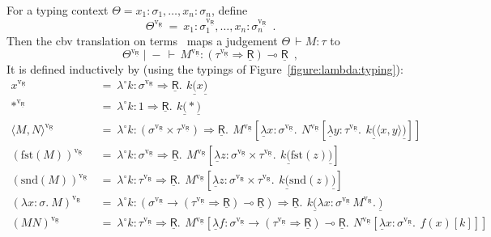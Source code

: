 \documentclass{LMCS}
\newcommand{\comptype}[1]{\underline{#1}}
\newcommand{\CR}{\comptype{\mathsf{R}}}
\newcommand{\Vone}{1}
\newcommand{\Vfun}{\to}
\newcommand{\lpop}{\multimap}
\newcommand{\Cfun}{\Rightarrow}
\newcommand{\In}[2]{#1 \colon  \! #2}
\newcommand{\rIn}[2]{#1 \colon  #2}
\newcommand{\Cj}[4]{#1 \mid  \! #2 \, \vdash \, \rIn{#3}{#4}}
\newcommand{\Vj}[3]{\Cj{#1}{{-}}{#2}{#3}}
\newcommand{\Vstar}{{*}}
\newcommand{\Vpair}[2]{\langle #1 , #2 \rangle}
\newcommand{\Vfst}[1]{\mathrm{fst}(#1)}
\newcommand{\Vsnd}[1]{\mathrm{snd}(#1)}
\newcommand{\Vlam}[3]{\lambda \In{#1}{#2}.\: #3}
\newcommand{\Vappl}[2]{#1(#2)}
\newcommand{\compop}[1]{\underline{#1}}
\newcommand{\Clam}[3]{\compop{\lambda} \In{#1}{#2}.\: #3}
\newcommand{\Cappl}[2]{#1\compop{(}#2\compop{)}}
\newcommand{\llambda}{\lambda^{\!\circ\!}}
\newcommand{\llam}[3]{\llambda \In{#1}{#2}.\: #3}
\newcommand{\lappl}[2]{#1[#2]}
\newcommand{\Lprod}{\times}
\newcommand{\Lj}[3]{#1  \, \vdash  \rIn{#2}{#3}}
\newcommand{\Lstar}{*}
\newcommand{\Lpair}[2]{\langle #1 , #2 \rangle}
\newcommand{\Lfst}[1]{\mathrm{fst}(#1)}
\newcommand{\Lsnd}[1]{\mathrm{snd}(#1)}
\newcommand{\Llam}[3]{\lambda \In{#1}{#2}.\: #3}
\newcommand{\Lappl}[2]{#1  #2}
\newcommand{\cbvLincps}[1]{#1^{\mathrm{v_{\CR}}}}
\begin{document}
For a typing context $\Theta = \In{x_1}{\sigma_1}, \ldots, \In{x_n}{\sigma_n}$, define
\[
\cbvLincps{\Theta} \: = \: \In{x_1}{\cbvLincps{\sigma_1}}, \ldots, \In{x_n}{\cbvLincps{\sigma_n}} \enspace .
\]
Then the cbv translation on terms~\cite{Hasegawa:Flops:02} maps a judgement 
$\Lj{\Theta}{M}{\tau}$ to
\[\Vj{\cbvLincps{\Theta}}{\cbvLincps{M}}{(\cbvLincps{\tau} \Cfun \CR) \lpop \CR} \enspace ,\]
It is defined inductively by (using the typings of Figure~\ref{figure:lambda:typing}):
\begin{align*}
\cbvLincps{x} \: & = \: \llam{k}{\cbvLincps{\sigma} \Cfun \CR}{\,\Cappl{k}{x}} \\
\cbvLincps{\Lstar} \: & = \: \llam{k}{\Vone \Cfun \CR}{\,\Cappl{k}{\Vstar}} \\
\cbvLincps{\Lpair{M}{N}} \: & = \: \llam{k}{(\cbvLincps{\sigma} \Lprod \cbvLincps{\tau}) \Cfun \CR}
     {\,\lappl{\cbvLincps{M}}{\Clam{x}{\cbvLincps{\sigma}}
         {\,\lappl{\cbvLincps{N}}{\Clam{y}{\cbvLincps{\tau}}{\,\Cappl{k}{\Vpair{x}{y}}}}}}} \\
\cbvLincps{(\Lfst{M})} \: & = \: \llam{k}{\cbvLincps{\sigma} \Cfun \CR}
     {\,\lappl{\cbvLincps{M}}{\Clam{z}{\cbvLincps{\sigma} \times \cbvLincps{\tau}}{\, \Cappl{k}{\Vfst{z}}}}} \\                  
\cbvLincps{(\Lsnd{M})} \: & = \:  \llam{k}{\cbvLincps{\tau} \Cfun \CR}
     {\,\lappl{\cbvLincps{M}}{\Clam{z}{\cbvLincps{\sigma} \times \cbvLincps{\tau}}{\, \Cappl{k}{\Vsnd{z}}}}} \\ 
\cbvLincps{(\Llam{x}{\sigma}{M})} \: & = \: \llam{k}{(\cbvLincps{\sigma} \Vfun (\cbvLincps{\tau} \Cfun \CR) \lpop \CR) \Cfun \CR}
     {\, \Cappl{k}{\Vlam{x}{\cbvLincps{\sigma}{\,\cbvLincps{M}}}}} \\
\cbvLincps{(\Lappl{M}{N})} \: & = \: \llam{k}{\cbvLincps{\tau} \Cfun \CR}
     {\,\lappl{\cbvLincps{M}}{\Clam{f}{\cbvLincps{\sigma} \Vfun (\cbvLincps{\tau} \Cfun \CR) \lpop \CR}
         {\,\lappl{\cbvLincps{N}}{\Clam{x}{\cbvLincps{\sigma}}{\,\lappl{\Vappl{f}{x}}{k}}}}}} 
\end{align*}
\end{document}

